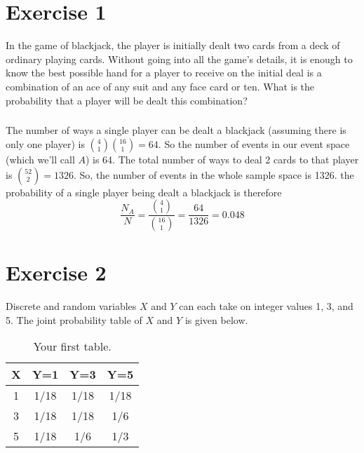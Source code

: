 \documentclass[11pt]{article}
\begin{document}
\thispagestyle{empty}

\newlength{\boxlength}\setlength{\boxlength}{\textwidth}
\addtolength{\boxlength}{-4mm}

\begin{center}
\end{center}

\section*{Exercise 1}
In the game of blackjack, the player is initially dealt two cards from a deck of ordinary playing cards. Without going into all the game's details, it is enough to know the best possible hand for a player to receive on the initial deal is a combination of an ace of any suit and any face card or ten. What is the probability that a player will be dealt this combination?

\subparagraph*{}
The number of ways a single player can be dealt a blackjack (assuming there is only one player) is ${4\choose1}{16\choose1} = 64$. So the number of events in our event space (which we'll call $A$) is 64. The total number of ways to deal 2 cards to that player is ${52\choose2} = 1326$. So, the number of events in the whole sample space is 1326. the probability of a single player being dealt a blackjack is therefore
\begin{equation*}
	\frac{N_A}{N} = \frac{{4\choose1}}{{16\choose1}} = \frac{64}{1326} = 0.048
\end{equation*}

\section*{Exercise 2}
Discrete and random variables $X$ and $Y$ can each take on integer values 1, 3, and 5. The joint probability table of $X$ and $Y$ is given below.

\begin{table}[h!]
  \begin{center}
    \caption{Your first table.}
    \label{tab:table1}
    \begin{tabular}{c|c|c|c} %
      X & Y=1 & Y=3 & Y=5\\
      \hline
      1 & 1/18 & 1/18 & 1/18 \\
      3 & 1/18 & 1/18 & 1/6 \\
      5 & 1/18 & 1/6 & 1/3\\
    \end{tabular}
  \end{center}
\end{table}
\end{document}

